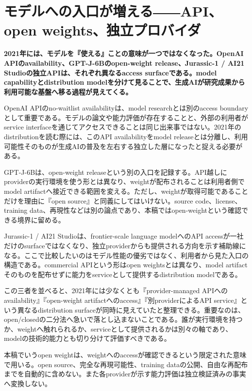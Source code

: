 \section{モデルへの入口が増える――API、open weights、独立プロバイダ}
\noindent\textbf{2021年には、モデルを『使える』ことの意味が一つではなくなった。OpenAI APIのavailability、GPT-J-6Bのopen-weight release、Jurassic-1 / AI21 Studioの独立APIは、それぞれ異なるaccess surfaceである。model capabilityとdistribution modelを分けて見ることで、生成AIが研究成果から利用可能な基盤へ移る過程が見えてくる。}\autocite{src-1b063a3564f3,src-b50beb89f16f,src-bf581c89a17f}

OpenAI APIのno-waitlist availabilityは、model researchとは別のaccess boundaryとして重要である。モデルの論文や能力評価が存在することと、外部の利用者がservice interfaceを通じてアクセスできることは同じ出来事ではない。2021年のdistributionを読む際には、このAPI availabilityをmodel releaseとは分離し、利用可能性そのものが生成AIの普及を左右する独立した層になったと捉える必要がある。\autocite{src-b50beb89f16f}


GPT-J-6Bは、open-weight releaseという別の入口を記録する。API越しにproviderの実行環境を使う形とは異なり、weightが配布されることは利用者側でmodel artifactへ接近できる範囲を変える。ただし、weightが取得可能であることだけを理由に『open source』と同義にしてはいけない。source code、license、training data、再現性などは別の論点であり、本稿ではopen-weightという確認できる境界に留める。\autocite{src-1b063a3564f3}


Jurassic-1 / AI21 Studioは、frontier-scale language modelへのAPI accessが一社だけのsurfaceではなくなり、独立providerからも提供される方向を示す補助線になる。ここで比較したいのはモデル性能の優劣ではなく、利用者から見た入口の構造である。commercial APIという形はopen weightsとは異なり、model artifactそのものを配布せずに能力をserviceとして提供するdistribution modelである。\autocite{src-bf581c89a17f}


この三者を並べると、2021年には少なくとも『provider-managed APIへのavailability』『open-weight artifactへのaccess』『別providerによるAPI service』という異なるdistribution surfaceが同時に見えていたと整理できる。重要なのは、open/closedの二分法へ急いで落とし込まないことである。誰が実行環境を持つか、weightへ触れられるか、serviceとして提供されるかは別々の軸であり、modelの技術的能力とも切り分けて評価すべきである。\autocite{src-1b063a3564f3,src-b50beb89f16f,src-bf581c89a17f}


\begin{claimboundary}
本稿でいうopen weightは、weightへのaccessが確認できるという限定された意味で用いる。open source、完全な再現可能性、training dataの公開、自由な再配布までを自動的に含めない。また各providerが示す能力評価は独立検証済みの事実へ変換しない。\autocite{src-1b063a3564f3,src-b50beb89f16f,src-bf581c89a17f}
\end{claimboundary}
